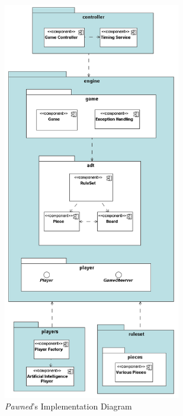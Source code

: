 		\begin{figure}
			\begin{center}
				\includegraphics[width=220pt]{img/component-diagram.png}
						\caption{\emph{Pawned}'s Implementation Diagram}
	  			\label{implementation-diagram}
		   \end{center}
	\end{figure}
	
